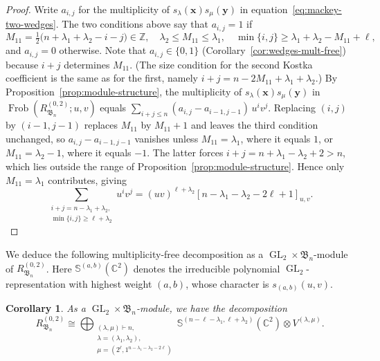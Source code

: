 \documentclass[12pt]{amsart}
\theoremstyle{plain}
\newtheorem{corollary}[theorem]{Corollary}
\theoremstyle{definition}
\DeclareMathOperator{\Frob}{Frob}
\DeclareMathOperator{\GL}{GL}
\newcommand{\Z}{\mathbb{Z}}
\newcommand{\C}{\mathbb{C}}
\newcommand{\x}{\mathbf{x}}
\newcommand{\y}{\mathbf{y}}
\begin{document}
\begin{proof}
Write $a_{i,j}$ for the multiplicity of $s_\lambda(\x)s_\mu(\y)$ in equation~\eqref{eq:mackey-two-wedges}.
The two conditions above say that $a_{i,j} = 1$ if
\begin{equation}
    M_{11} = \tfrac{1}{2}\big(n + \lambda_1 + \lambda_2 - i - j\big) \in \Z, \quad
    \lambda_2 \leq M_{11} \leq \lambda_1, \quad
    \min\{i,j\} \geq \lambda_1 + \lambda_2 - M_{11} + \ell,
\end{equation}
and $a_{i,j} = 0$ otherwise. 
Note that $a_{i,j} \in \{0,1\}$ (Corollary~\ref{cor:wedges-mult-free}) because $i+j$ determines $M_{11}$.
(The size condition for the second Kostka coefficient is the same as for the first, namely $i + j = n - 2M_{11} + \lambda_1 + \lambda_2$.)
By Proposition~\ref{prop:module-structure}, the multiplicity of $s_\lambda(\x)s_\mu(\y)$ in $\Frob(R_{\mathfrak{B}_n}^{(0,2)};u,v)$ equals $\sum_{i+j \leq n} (a_{i,j} - a_{i-1,j-1})\,u^i v^j$.
Replacing $(i,j)$ by $(i-1,j-1)$ replaces $M_{11}$ by $M_{11}+1$ and leaves the third condition unchanged, so $a_{i,j} - a_{i-1,j-1}$ vanishes unless $M_{11} = \lambda_1$, where it equals $1$, or $M_{11} = \lambda_2 - 1$, where it equals $-1$.
The latter forces $i + j = n + \lambda_1 - \lambda_2 + 2 > n$, which lies outside the range of Proposition~\ref{prop:module-structure}.
Hence only $M_{11} = \lambda_1$ contributes, giving
\begin{equation}
    \sum_{\substack{{i+j = n-\lambda_1 + \lambda_2,}\\{\min\{i,j\} \geq \ell + \lambda_2}}} u^iv^j = (uv)^{\ell+ \lambda_2} [n-\lambda_1-\lambda_2 -2\ell +1]_{u,v}.
\end{equation}
\end{proof}

We deduce the following multiplicity-free decomposition as a $\GL_2 \times \mathfrak{B}_n$-module of $R_{\mathfrak{B}_n}^{(0,2)}$. 
Here $\mathbb{S}^{(a,b)}(\C^2)$ denotes the irreducible polynomial $\GL_2$-representation with highest weight $(a,b)$, whose character is $s_{(a,b)}(u,v)$.
\begin{corollary}\label{cor:multiplicity-free}
    As a $\GL_2 \times \mathfrak{B}_n$-module, we have the decomposition
    \begin{equation}
        R_{\mathfrak{B}_n}^{(0,2)} \cong \bigoplus_{\substack{(\lambda, \mu) \vdash n,\\
        \lambda = (\lambda_1,\lambda_2),\\
        \mu = (2^\ell, 1^{n-\lambda_1-\lambda_2 - 2\ell})}}
        \mathbb{S}^{(n-\ell-\lambda_1, \ell+\lambda_2)}(\C^2) \otimes V^{(\lambda, \mu)}.
    \end{equation}
\end{corollary}
\end{document}
